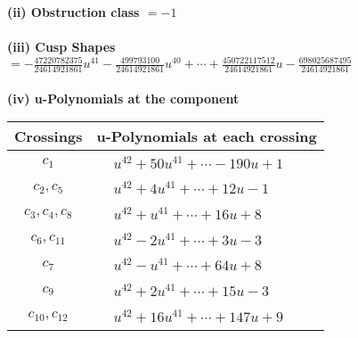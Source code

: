 \documentclass[1p]{elsarticle_modified}
\theoremstyle{definition}
\begin{document}
\flushleft \textbf{(ii) Obstruction class $= -1$}\\~\\
\flushleft \textbf{(iii) Cusp Shapes $= -\frac{47220782375}{24614921861} u^{41}-\frac{499793100}{24614921861} u^{40}+\cdots+\frac{450722117512}{24614921861} u-\frac{698025687495}{24614921861}$}\\~\\
\newpage\renewcommand{\arraystretch}{1}
\flushleft \textbf{(iv) u-Polynomials at the component}\newline \\
\begin{tabular}{m{50pt}|m{274pt}}
Crossings & \hspace{64pt}u-Polynomials at each crossing \\
\hline $$\begin{aligned}c_{1}\end{aligned}$$&$\begin{aligned}
&u^{42}+50 u^{41}+\cdots-190 u+1
\end{aligned}$\\
\hline $$\begin{aligned}c_{2},c_{5}\end{aligned}$$&$\begin{aligned}
&u^{42}+4 u^{41}+\cdots+12 u-1
\end{aligned}$\\
\hline $$\begin{aligned}c_{3},c_{4},c_{8}\end{aligned}$$&$\begin{aligned}
&u^{42}+u^{41}+\cdots+16 u+8
\end{aligned}$\\
\hline $$\begin{aligned}c_{6},c_{11}\end{aligned}$$&$\begin{aligned}
&u^{42}-2 u^{41}+\cdots+3 u-3
\end{aligned}$\\
\hline $$\begin{aligned}c_{7}\end{aligned}$$&$\begin{aligned}
&u^{42}- u^{41}+\cdots+64 u+8
\end{aligned}$\\
\hline $$\begin{aligned}c_{9}\end{aligned}$$&$\begin{aligned}
&u^{42}+2 u^{41}+\cdots+15 u-3
\end{aligned}$\\
\hline $$\begin{aligned}c_{10},c_{12}\end{aligned}$$&$\begin{aligned}
&u^{42}+16 u^{41}+\cdots+147 u+9
\end{aligned}$\\
\hline
\end{tabular}\\~\\
\end{document}
